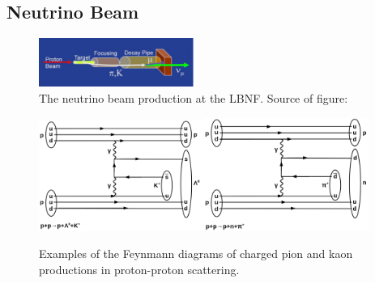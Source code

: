 \subsection{Neutrino Beam}

\begin{figure}
\caption{The neutrino beam production at the LBNF. Source of figure: \cite{ref_LBNFweb}}
\label{fig:LBNF_nuBeam}
\centering
\includegraphics[width=0.45\textwidth, keepaspectratio=true]{figs/LBNF_nuBeam.png}  
\end{figure}


\begin{figure}
\caption{Examples of the Feynmann diagrams of charged pion and kaon productions in proton-proton scattering.}
\label{fig:pionAndKaonProductions}
\centering
\includegraphics[width=0.48\textwidth, keepaspectratio=true]{figs/ppKaonProduction.png}\includegraphics[width=0.48\textwidth, keepaspectratio=true]{figs/ppPionProduction.png}  
\end{figure}



